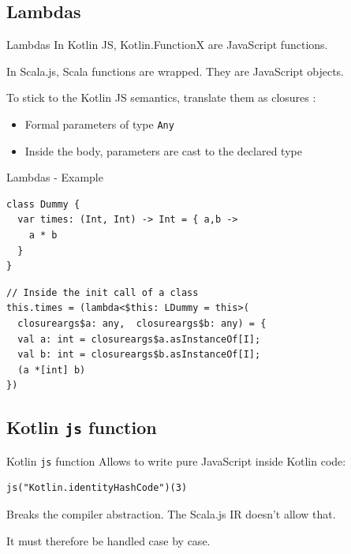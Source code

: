 \documentclass[10pt,usenames,dvipsnames]{beamer}
\newcommand{\inlinecode}[2]{\colorbox{minted-bg}{\lstinline[language=#1]$#2$}}
\newcommand{\ktinline}[1]{\inlinecode{kotlin}{#1}}
\begin{document}

\subsection{Lambdas}

\begin{frame}[fragile]{Lambdas} 
 In Kotlin JS, Kotlin.FunctionX are JavaScript functions.
 
 In Scala.js, Scala functions are wrapped. They are JavaScript objects.
 
 
 To stick to the Kotlin JS semantics, translate them as closures :
 \begin{itemize}
  \item Formal parameters of type \ktinline{Any}
  \item Inside the body, parameters are cast to the declared type
 \end{itemize}
\end{frame}

\begin{frame}[fragile]{Lambdas - Example}
 \begin{verbatim}
class Dummy {
  var times: (Int, Int) -> Int = { a,b ->
    a * b
  }
}
 \end{verbatim}
 \begin{verbatim}
// Inside the init call of a class
this.times = (lambda<$this: LDummy = this>(
  closureargs$a: any,  closureargs$b: any) = {
  val a: int = closureargs$a.asInstanceOf[I];
  val b: int = closureargs$b.asInstanceOf[I];
  (a *[int] b)
})
 \end{verbatim}
 
\end{frame}
 

\subsection{Kotlin \ktinline{js} function}

\begin{frame}[fragile]{Kotlin \ktinline{js} function}
  Allows to write pure JavaScript inside Kotlin code:
  
  \begin{verbatim}
js("Kotlin.identityHashCode")(3)
  \end{verbatim}


  Breaks the compiler abstraction. The Scala.js IR doesn't allow that.
  
  It must therefore be handled case by case.

\end{frame}
\end{document}
